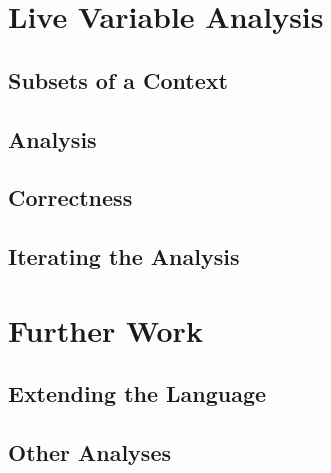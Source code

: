 \documentclass[11pt,a4paper]{article}
\begin{document}
\section{Live Variable Analysis}

\subsection{Subsets of a Context}
\cite{chapman2009type}

\CodeSubsetSubset
\CodeSubsetOpSubseteq

\subsection{Analysis}

\CodeLiveExpr

\subsection{Correctness}

\subsection{Iterating the Analysis}


\section{Further Work}

\subsection{Extending the Language}

\subsection{Other Analyses}


{}
\end{document}
